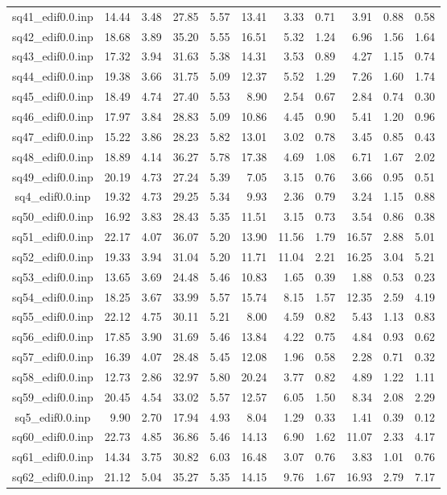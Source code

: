 {\begin{longtable}{@{}cr@{\hspace{1em}}r@{\hspace{1em}}r@{\hspace{1em}}r@{\hspace{1em}}r@{\hspace{2em}}r@{\hspace{1em}}r@{\hspace{1em}}r@{\hspace{1em}}r@{\hspace{1em}}r@{}}
sq41\_edif0.0.inp&14.44&3.48&27.85&5.57&13.41&3.33&0.71&3.91&0.88&0.58\\
sq42\_edif0.0.inp&18.68&3.89&35.20&5.55&16.51&5.32&1.24&6.96&1.56&1.64\\
sq43\_edif0.0.inp&17.32&3.94&31.63&5.38&14.31&3.53&0.89&4.27&1.15&0.74\\
sq44\_edif0.0.inp&19.38&3.66&31.75&5.09&12.37&5.52&1.29&7.26&1.60&1.74\\
sq45\_edif0.0.inp&18.49&4.74&27.40&5.53&8.90&2.54&0.67&2.84&0.74&0.30\\
sq46\_edif0.0.inp&17.97&3.84&28.83&5.09&10.86&4.45&0.90&5.41&1.20&0.96\\
sq47\_edif0.0.inp&15.22&3.86&28.23&5.82&13.01&3.02&0.78&3.45&0.85&0.43\\
sq48\_edif0.0.inp&18.89&4.14&36.27&5.78&17.38&4.69&1.08&6.71&1.67&2.02\\
sq49\_edif0.0.inp&20.19&4.73&27.24&5.39&7.05&3.15&0.76&3.66&0.95&0.51\\
sq4\_edif0.0.inp&19.32&4.73&29.25&5.34&9.93&2.36&0.79&3.24&1.15&0.88\\
sq50\_edif0.0.inp&16.92&3.83&28.43&5.35&11.51&3.15&0.73&3.54&0.86&0.38\\
sq51\_edif0.0.inp&22.17&4.07&36.07&5.20&13.90&11.56&1.79&16.57&2.88&5.01\\
sq52\_edif0.0.inp&19.33&3.94&31.04&5.20&11.71&11.04&2.21&16.25&3.04&5.21\\
sq53\_edif0.0.inp&13.65&3.69&24.48&5.46&10.83&1.65&0.39&1.88&0.53&0.23\\
sq54\_edif0.0.inp&18.25&3.67&33.99&5.57&15.74&8.15&1.57&12.35&2.59&4.19\\
sq55\_edif0.0.inp&22.12&4.75&30.11&5.21&8.00&4.59&0.82&5.43&1.13&0.83\\
sq56\_edif0.0.inp&17.85&3.90&31.69&5.46&13.84&4.22&0.75&4.84&0.93&0.62\\
sq57\_edif0.0.inp&16.39&4.07&28.48&5.45&12.08&1.96&0.58&2.28&0.71&0.32\\
sq58\_edif0.0.inp&12.73&2.86&32.97&5.80&20.24&3.77&0.82&4.89&1.22&1.11\\
sq59\_edif0.0.inp&20.45&4.54&33.02&5.57&12.57&6.05&1.50&8.34&2.08&2.29\\
sq5\_edif0.0.inp&9.90&2.70&17.94&4.93&8.04&1.29&0.33&1.41&0.39&0.12\\
sq60\_edif0.0.inp&22.73&4.85&36.86&5.46&14.13&6.90&1.62&11.07&2.33&4.17\\
sq61\_edif0.0.inp&14.34&3.75&30.82&6.03&16.48&3.07&0.76&3.83&1.01&0.76\\
sq62\_edif0.0.inp&21.12&5.04&35.27&5.35&14.15&9.76&1.67&16.93&2.79&7.17\\

\end{longtable}}
